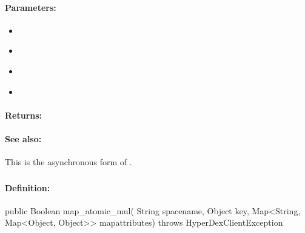 \paragraph{Parameters:}
\begin{itemize}[noitemsep]
\item {}\\

\item {}\\

\item {}\\

\item {}\\

\end{itemize}

\paragraph{Returns:}


\paragraph{See also:}  This is the asynchronous form of .

\pagebreak
\subsubsection{}
\label{api:java:map_atomic_mul}


\paragraph{Definition:}
\begin{javacode}
public Boolean map_atomic_mul(
        String spacename,
        Object key,
        Map<String, Map<Object, Object>> mapattributes) throws HyperDexClientException
\end{javacode}

